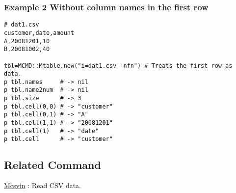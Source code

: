 \subsubsection*{Example 2 Without column names in the first row}

\begin{Verbatim}[baselinestretch=0.7,frame=single]
# dat1.csv
customer,date,amount
A,20081201,10
B,20081002,40

tbl=MCMD::Mtable.new("i=dat1.csv -nfn") # Treats the first row as data.
p tbl.names     # -> nil
p tbl.name2num  # -> nil
p tbl.size      # -> 3
p tbl.cell(0,0) # -> "customer"
p tbl.cell(0,1) # -> "A"
p tbl.cell(1,1) # -> "20081201"
p tbl.cell(1)   # -> "date"
p tbl.cell      # -> "customer"
\end{Verbatim}

\subsection{Related Command}
\hyperref[sect:mcsvinRB]{Mcsvin} : Read CSV data. 

%

